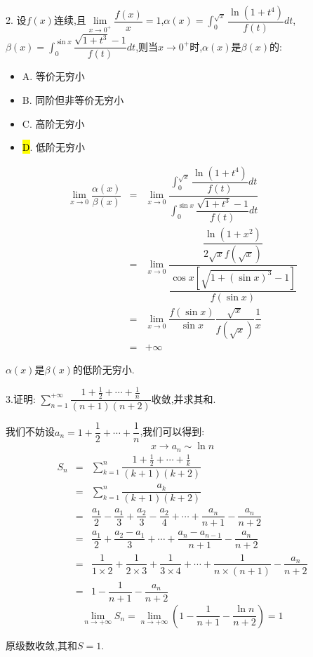 2. 设$f(x)$连续,且$\lim\limits_{x\rightarrow 0^{+}}\dfrac{f(x)}{x}=1$,$\alpha(x)=\int_{0}^{\sqrt{x}}\dfrac{\ln(1+t^4)}{f(t)}dt$,$\beta(x)=\int_{0}^{\sin x}\dfrac{\sqrt{1+t^3}-1}{f(t)}dt$,则当$x\rightarrow 0^{+}$时,$\alpha(x)$是$\beta(x)$的: 
\begin{itemize}
	\item A. 等价无穷小
	\item B. 同阶但非等价无穷小
	\item C. 高阶无穷小
	\item \hl{D}. 低阶无穷小
\end{itemize}
\begin{solution}
	\begin{eqnarray*}
		\lim\limits_{x\rightarrow 0}\dfrac{\alpha(x)}{\beta(x)}&=&\lim\limits_{x\rightarrow 0}\dfrac{\int_{0}^{\sqrt{x}}\dfrac{\ln(1+t^4)}{f(t)}dt}{\int_{0}^{\sin x}\dfrac{\sqrt{1+t^3}-1}{f(t)}dt}\\
		&=&\lim\limits_{x\rightarrow 0}\dfrac{\dfrac{\ln(1+x^2)}{2\sqrt{x}f(\sqrt{x})}}{\dfrac{\cos x[\sqrt{1+(\sin x)^3}-1]}{f(\sin x)}}\\
		&=&\lim\limits_{x\rightarrow 0}\dfrac{f(\sin x)}{\sin x}\dfrac{\sqrt{x}}{f(\sqrt{x})}\dfrac{1}{x}\\
		&=&+\infty
	\end{eqnarray*}
	
	$\alpha(x)$是$\beta(x)$的低阶无穷小.
\end{solution}

3.证明: $\sum\limits_{n=1}^{+\infty}\dfrac{1+\frac{1}{2}+\cdots+\frac{1}{n}}{(n+1)(n+2)}$收敛,并求其和.
\begin{solution}
	
	我们不妨设$a_{n}=1+\dfrac{1}{2}+\cdots+\dfrac{1}{n}$,我们可以得到: 
	$$x\rightarrow a_{n}\sim \ln n$$
	\begin{eqnarray*}
		S_{n}&=&\sum\limits_{k=1}^{n}\dfrac{1+\frac{1}{2}+\cdots+\frac{1}{k}}{(k+1)(k+2)}\\
		&=&\sum\limits_{k=1}^{n}\dfrac{a_{k}}{(k+1)(k+2)}\\
		&=&\dfrac{a_{1}}{2}-\dfrac{a_{1}}{3}+\dfrac{a_{2}}{3}-\dfrac{a_{2}}{4}+\cdots+\dfrac{a_{n}}{n+1}-\dfrac{a_{n}}{n+2}\\
		&=&\dfrac{a_{1}}{2}+\dfrac{a_{2}-a_{1}}{3}+\cdots+\dfrac{a_{n}-a_{n-1}}{n+1}-\dfrac{a_{n}}{n+2}\\
		&=&\dfrac{1}{1\times 2}+\dfrac{1}{2\times 3}+\dfrac{1}{3\times 4}+\cdots+\dfrac{1}{n\times (n+1)}-\dfrac{a_{n}}{n+2}\\
		&=&1-\dfrac{1}{n+1}-\dfrac{a_{n}}{n+2}
	\end{eqnarray*}
	$$\lim\limits_{n\rightarrow+\infty}S_{n}=\lim\limits_{n\rightarrow+\infty}(1-\dfrac{1}{n+1}-\dfrac{\ln n}{n+2})=1$$
	
	原级数收敛,其和$S=1$.
\end{solution}

